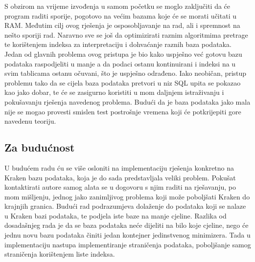 \documentclass[times, utf8, zavrsni]{fer}
\begin{document}
{S obzirom na vrijeme izvođenja u samom početku se moglo zaključiti da će program raditi sporije, pogotovo na većim bazama koje će se morati učitati u RAM. Međutim cilj ovog rješenja je osposobljavanje na rad, ali i spremnost na nešto sporiji rad. Naravno sve se još da optimizirati raznim algoritmima pretrage te korištenjem indeksa za interpretaciju i dohvaćanje raznih baza podataka. Jedan od glavnih problema ovog pristupa je bio kako uspješno već gotovu bazu podataka raspodjeliti u manje a da podaci ostanu kontinuirani i indeksi na u svim tablicama ostanu očuvani, što je uspješno odrađeno. Iako neobičan, pristup problemu tako da se cijela baza podataka pretvori u niz SQL upita se pokazao kao jako dobar, te će se zasigurno koristiti u mom daljnjem istraživanju i pokušavanju rješenja navedenog problema. Budući da je baza podataka jako mala nije se mogao provesti smislen test postrošnje vremena koji će potkrijepiti gore navedenu teoriju.
\subsection{Za budućnost}
U budućem radu ću se više osloniti na implementaciju rješenja konkretno na Kraken bazu podataka, koja je do sada predstavljala veliki problem. Pokušat kontaktirati autore samog alata se u dogovoru s njim raditi na rješavanju, po mom mišljenju, jednog jako zanimljivog problema koji može poboljšati Kraken do krajnjih granica. Budući rad podrazumjeva dolaženje do podataka koji se nalaze u Kraken bazi podataka, te podjela iste baze na manje cjeline. Razlika od dosadašnjeg rada je da se baza podataka neće dijeliti na bilo koje cjeline, nego će jednu novu bazu podataka činiti jedan kontejner jedinstvenog minimizera. Tada u implementaciju nastupa implementiranje straničenja podataka, poboljšanje samog straničenja korištenjem liste indeksa.
}
\end{document}
